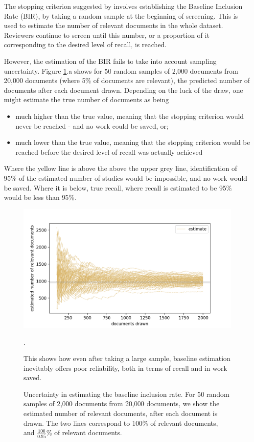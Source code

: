 \documentclass{bmcart}
\begin{document}
	The stopping criterion suggested by \cite{Shemilt2014} involves establishing the Baseline Inclusion Rate (BIR), by taking a random sample at the beginning of screening. 
	This is used to estimate the number of relevant documents in the whole dataset. 
	Reviewers continue to screen until this number, or a proportion of it corresponding to the desired level of recall, is reached.
	

	
	However, the estimation of the BIR fails to take into account sampling uncertainty. 
	Figure \ref{bir-sampling}.a shows for 50 random samples of 2,000 documents from 20,000 documents (where 5\% of documents are relevant), the predicted number of documents after each document drawn. 
	Depending on the luck of the draw, one might estimate the true number of documents as being
	\begin{itemize}
		\item much higher than the true value, meaning that the stopping criterion would never be reached - and no work could be saved, or;
		\item much lower than the true value, meaning that the stopping criterion would be reached before the desired level of recall was actually achieved
	\end{itemize}
	
	Where the yellow line is above the above the upper grey line, identification of 95\% of the estimated number of studies would be impossible, and no work would be saved. Where it is below, true recall, where recall is estimated to be 95\% would be less than 95\%.

	\begin{figure}
	\includegraphics[width=\linewidth]{../images/bir_sampling_noci.png}
	\caption{Uncertainty in estimating the baseline inclusion rate. For 50 random samples of 2,000 documents from 20,000 documents, we show the estimated number of relevant documents, after each document is drawn. The two lines correspond to 100\% of relevant documents, and $\frac{100}{0.95}$\% of relevant documents.}
	\label{bir-sampling}.
	
	This shows how even after taking a large sample, baseline estimation inevitably offers poor reliability, both in terms of recall and in work saved.
\end{figure}
\end{document}
